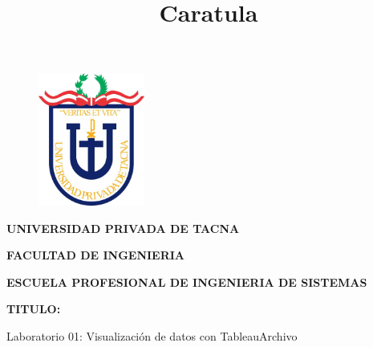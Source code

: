 \documentclass[12pt,letterpaper]{article}
\begin{document}
%

  
\title{Caratula}

\begin{titlepage}
    \begin{center}
    \begin{figure}[htb]
    \begin{center}
    \includegraphics[width=3.5cm]{./img/upt.jpg}
    \end{center}
    \end{figure}
    
    \vspace*{0.15in}
    \begin{Large}
    \textbf{UNIVERSIDAD PRIVADA DE TACNA}\\
    \end{Large}
    
    \vspace*{0.1in}
    \begin{Large}
    \textbf{FACULTAD DE INGENIERIA} \\
    \end{Large}
    
    \vspace*{0.1in}
    \begin{Large}
    \textbf{ESCUELA PROFESIONAL DE INGENIERIA DE SISTEMAS} \\
    \end{Large}
    
    \vspace*{0.5in}
    \begin{Large}
    \textbf{TITULO:}\\
    \end{Large}
    

\vspace*{0.1in}
\begin{Large}
    Laboratorio 01: Visualización de datos con TableauArchivo \\
\end{Large}


\end{center}
\end{titlepage}
\end{document}
